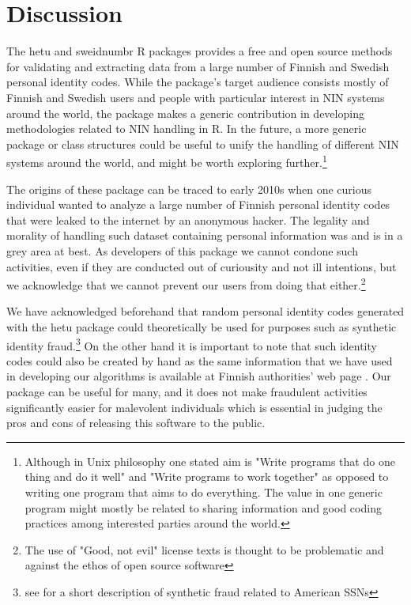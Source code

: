 \section{Discussion}

The hetu and sweidnumbr R packages provides a free and open source methods for validating and extracting data from a large number of Finnish and Swedish personal identity codes. While the package's target audience consists mostly of Finnish and Swedish users and people with particular interest in NIN systems around the world, the package makes a generic contribution in developing methodologies related to NIN handling in R. In the future, a more generic package or class structures could be useful to unify the handling of different NIN systems around the world, and might be worth exploring further.\footnote{Although in Unix philosophy one stated aim is "Write programs that do one thing and do it well" and "Write programs to work together" as opposed to writing one program that aims to do everything. The value in one generic program might mostly be related to sharing information and good coding practices among interested parties around the world.}

The origins of these package can be traced to early 2010s when one curious individual wanted to analyze a large number of Finnish personal identity codes that were leaked to the internet by an anonymous hacker. The legality and morality of handling such dataset containing personal information was and is in a grey area at best. As developers of this package we cannot condone such activities, even if they are conducted out of curiousity and not ill intentions, but we acknowledge that we cannot prevent our users from doing that either.\footnote{The use of "Good, not evil" license texts is thought to be problematic and against the ethos of open source software}

We have acknowledged beforehand that random personal identity codes generated with the hetu package could theoretically be used for purposes such as synthetic identity fraud.\footnote{see \citet[32]{brensinger2021} for a short description of synthetic fraud related to American SSNs} On the other hand it is important to note that such identity codes could also be created by hand as the same information that we have used in developing our algorithms is available at Finnish authorities' web page \citep{hetudvv}. Our package can be useful for many, and it does not make fraudulent activities significantly easier for malevolent individuals which is essential in judging the pros and cons of releasing this software to the public.

